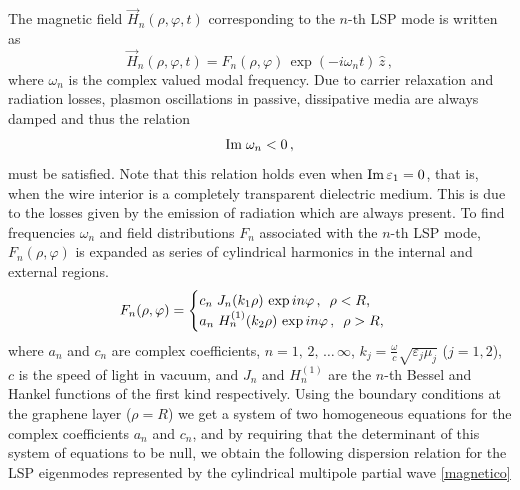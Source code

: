 \documentclass[9pt,twocolumn,twoside]{osajnl}
\begin{document}
The magnetic field $\vec H_{n}(\rho,\varphi,t)$ corresponding to the \mbox{$n$-th} LSP mode is written as
\begin{equation} 
\vec H_{n}(\rho,\varphi,t)= F_{n}(\rho,\varphi) \, \exp{(-i\omega_n t)}\,\hat z\,, \label{magnetico}
\end{equation}
where $\omega_n$ is the complex valued modal frequency. Due to carrier relaxation and radiation losses, plasmon oscillations in passive, dissipative media are always damped and thus the relation 
\begin{equation} 
{\rm Im \mit} \;\omega_n < 0 \,, \label{eqn:condomega}
\end{equation}
must be satisfied. Note that this relation holds even when ${\rm Im \mit} \,\varepsilon_1=0$, that is, when the wire interior is a completely transparent dielectric medium. This is due to the
losses given by the emission of radiation which are always
present.
%
%
To find frequencies $\omega_n$ and field distributions $F_n$ associated with the $n$-th LSP mode, $F_n (\rho,\varphi)$ is expanded as series of  cylindrical harmonics in the internal 
and external 
regions. 
%
\begin{equation} 
F_{n}(\rho,\varphi)=   
\begin{cases} 
   c_{n}\;J_n(k_1\rho)\,\exp{i n\varphi}  \,, \text{\, $\rho < R$,}         \\
   a_{n}\;H_n^{(1)}(k_2\rho) \,\exp{in\varphi}\,, \text{\, $\rho > R$,}
\end{cases}      \label{Fz12p}
\end{equation}
where $a_{n}$ and $c_{n}$ are complex coefficients, $n=1,\, 2,\, \ldots \,\infty$, $k_{j}=\frac{\omega}{c}\sqrt{\varepsilon_{j}\mu_{j}}$ ($j=1, 2$), $c$ is the speed of light in vacuum, and $J_n$ and $H_n^{(1)}$ are the $n$-th Bessel and Hankel functions of the first kind respectively.  
%
%
Using the boundary conditions at the graphene layer ($\rho = R$) we get a system of two homogeneous equations for the complex coefficients $a_{n}$ and $c_{n}$, and by requiring that the determinant of this system of equations to be null, we obtain the following dispersion relation for the LSP eigenmodes represented by the cylindrical multipole partial wave \eqref{magnetico} 
\end{document}
